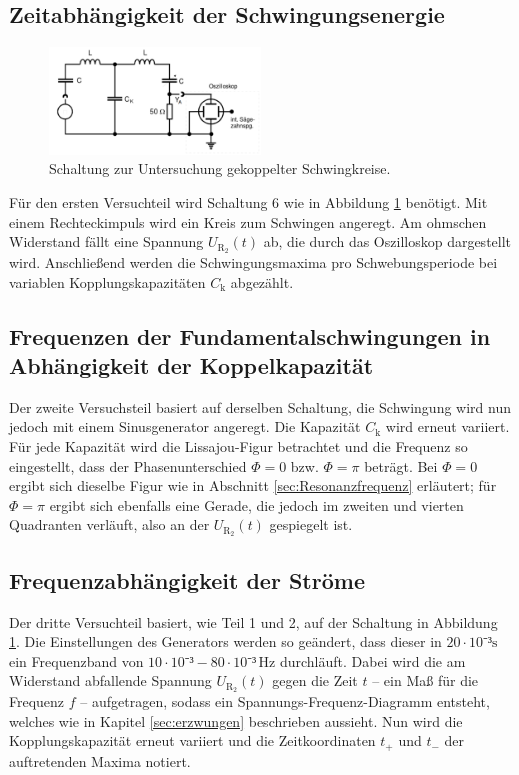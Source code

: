 \subsection{Zeitabhängigkeit der Schwingungsenergie}

\begin{figure}[h]
	\centering
	\label{fig:versuchsaufbau}
		\includegraphics[width=0.5\textwidth]{Bilder/Versuchsaufbau.pdf}
		\caption{Schaltung zur Untersuchung gekoppelter Schwingkreise.}
\end{figure}
Für den ersten Versuchteil wird Schaltung 6 wie in Abbildung \ref{fig:versuchsaufbau} benötigt. Mit einem Rechteckimpuls wird ein Kreis zum Schwingen angeregt. Am ohmschen Widerstand fällt eine Spannung $U_\mathup{R_2}(t)$ ab, die durch das Oszilloskop dargestellt wird. Anschließend werden die Schwingungsmaxima pro Schwebungsperiode bei variablen Kopplungskapazitäten $C_\mathup{k}$ abgezählt.

\subsection{Frequenzen der Fundamentalschwingungen in Abhängigkeit der Koppelkapazität}
Der zweite Versuchsteil basiert auf derselben Schaltung, die Schwingung wird nun jedoch mit einem Sinusgenerator angeregt.
Die Kapazität $C_\mathup{k}$ wird erneut variiert. Für jede Kapazität wird die Lissajou-Figur betrachtet und die Frequenz so eingestellt, dass der Phasenunterschied $\Phi=0$ bzw. $\Phi=\pi$ beträgt. Bei $\Phi=0$ ergibt sich dieselbe Figur wie in Abschnitt \ref{sec:Resonanzfrequenz} erläutert; für $\Phi=\pi$  ergibt sich ebenfalls eine Gerade, die jedoch im zweiten und vierten Quadranten verläuft, also an der $U_\mathup{R_2}(t)$ gespiegelt ist.

\subsection{Frequenzabhängigkeit der Ströme}

Der dritte Versuchteil basiert, wie Teil 1 und 2, auf der Schaltung in Abbildung \ref{fig:versuchsaufbau}. Die Einstellungen des Generators werden so geändert, dass dieser in $20\cdot10⁻³\si\second$ ein Frequenzband von $10\cdot10⁻³-80\cdot10⁻³\,\si{\hertz}$ durchläuft. Dabei wird die am Widerstand abfallende Spannung $U_\mathup{R_2}(t)$ gegen die Zeit $t$ -- ein Maß für die Frequenz $f$ -- aufgetragen, sodass ein Spannungs-Frequenz-Diagramm entsteht, welches wie in Kapitel \ref{sec:erzwungen} beschrieben aussieht. Nun wird die Kopplungskapazität erneut variiert und die Zeitkoordinaten $t_+$ und $t_-$ der auftretenden Maxima notiert.
